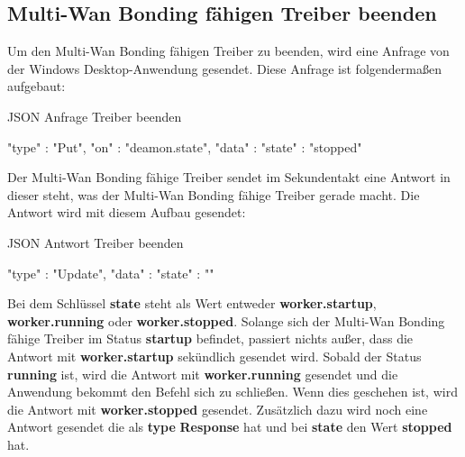 \subsection{Multi-Wan Bonding fähigen Treiber beenden}
Um den Multi-Wan Bonding fähigen Treiber zu beenden, wird eine Anfrage von der Windows Desktop-Anwendung gesendet. Diese Anfrage ist folgendermaßen aufgebaut:
\begin{program}[H]
\caption{JSON Anfrage Treiber beenden}
\begin{GenericCode}
    {
        "type" :  "Put",
        "on" :  "deamon.state",
        "data" : {"state" : "stopped"} 
    }     
\end{GenericCode}
\end{program}
\newpage
\noindent
Der Multi-Wan Bonding fähige Treiber sendet im Sekundentakt eine Antwort in dieser steht, was der Multi-Wan Bonding fähige Treiber gerade macht. Die Antwort wird mit diesem Aufbau gesendet:
\begin{program}[H]
\caption{JSON Antwort Treiber beenden}
\begin{GenericCode}
    {
        "type" :  "Update",
        "data" : {"state" : ""} 
    }    
\end{GenericCode}
\end{program}
\noindent
Bei dem Schlüssel \textbf{state} steht als Wert entweder \textbf{worker.startup}, \textbf{worker.running} oder \textbf{worker.stopped}. Solange sich der Multi-Wan Bonding fähige Treiber im Status \textbf{startup} befindet, passiert nichts außer, dass die Antwort mit \textbf{worker.startup} sekündlich gesendet wird. Sobald der Status \textbf{running} ist, wird die Antwort mit \textbf{worker.running} gesendet und die Anwendung bekommt den Befehl sich zu schließen. Wenn dies geschehen ist, wird die Antwort mit \textbf{worker.stopped} gesendet. Zusätzlich dazu wird noch eine Antwort gesendet die als \textbf{type} \textbf{Response} hat und bei \textbf{state} den Wert \textbf{stopped} hat.


